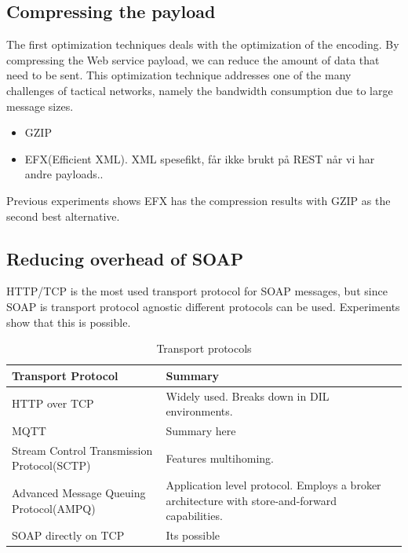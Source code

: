 \documentclass[USenglish]{ifimaster}
\begin{document}
\subsection{Compressing the payload}

The first optimization techniques deals with the optimization of the encoding.
By compressing the Web service payload, we can reduce the amount of data that
need to be sent. This optimization technique addresses one of the many
challenges of tactical networks, namely the bandwidth consumption due to large
message sizes.

\begin{itemize}
\item GZIP

\item EFX(Efficient XML). XML spesefikt, får ikke brukt på REST når vi har andre
payloads..

\end{itemize}

Previous experiments shows EFX has the compression results with GZIP as the
second best alternative\cite{johnsen-trude-compression-techniqes}.


\subsection{Reducing overhead of SOAP}
HTTP/TCP is the most used transport protocol for SOAP messages, but since SOAP is transport protocol agnostic different protocols can be used. Experiments show that this is possible.


\begin{table}[h]
\begin{tabularx}{\textwidth}{| X | X |}
\hline
  \textbf{Transport Protocol} & \textbf{Summary} \\ \hline
  HTTP over TCP & Widely used. Breaks down in DIL environments.\\ \hline
  MQTT & Summary here\\ \hline
  Stream Control Transmission Protocol(SCTP) & Features multihoming. \\ \hline
  Advanced Message Queuing Protocol(AMPQ) & Application level protocol. Employs
  a broker architecture with store-and-forward capabilities. \\ \hline
  SOAP directly on TCP & Its possible \\ \hline
\end{tabularx}
\caption{Transport protocols}
\end{table}
\end{document}
